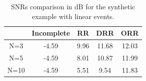 %




\newpage
\listoftables

\newpage
\listoffigures
\newpage


\begin{table}[h]
\caption{SNRs comparison in dB for the synthetic example with linear events.}
\begin{center}
     \begin{tabular}{|c|c|c|c|c|} 
	  \hline &Incomplete & RR  & DRR  & ORR \\ 
	  \hline N=3    & -4.59 & 9.96 & 11.68 & 12.03 \\	  
	  \hline N=5    & -4.59 & 8.01 & 10.87 & 11.99 \\
	  \hline N=10 & -4.59 & 5.51 & 9.54 & 11.83 \\
       \hline
    \end{tabular} 
\end{center}
\label{tbl:plane}
\end{table}

